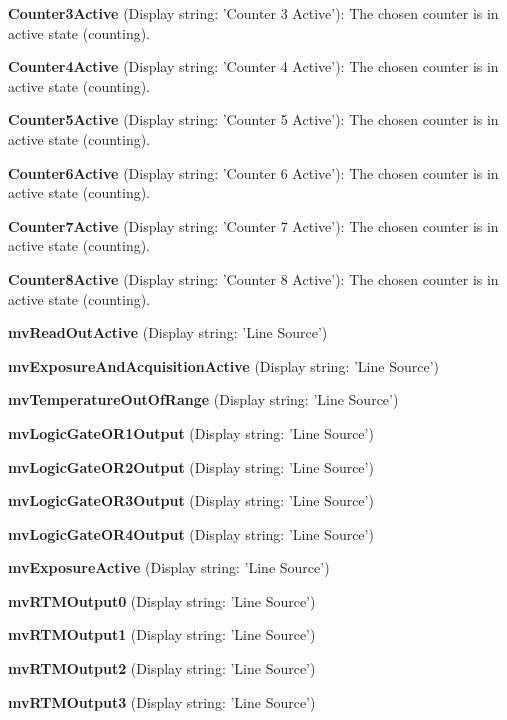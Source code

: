 \begin{DoxyItemize}
\item {\bfseries Counter3\+Active} (Display string\+: 'Counter 3 Active')\+: The chosen counter is in active state (counting).
\item {\bfseries Counter4\+Active} (Display string\+: 'Counter 4 Active')\+: The chosen counter is in active state (counting).
\item {\bfseries Counter5\+Active} (Display string\+: 'Counter 5 Active')\+: The chosen counter is in active state (counting).
\item {\bfseries Counter6\+Active} (Display string\+: 'Counter 6 Active')\+: The chosen counter is in active state (counting).
\item {\bfseries Counter7\+Active} (Display string\+: 'Counter 7 Active')\+: The chosen counter is in active state (counting).
\item {\bfseries Counter8\+Active} (Display string\+: 'Counter 8 Active')\+: The chosen counter is in active state (counting).
\item {\bfseries mv\+Read\+Out\+Active} (Display string\+: 'Line Source')
\item {\bfseries mv\+Exposure\+And\+Acquisition\+Active} (Display string\+: 'Line Source')
\item {\bfseries mv\+Temperature\+Out\+Of\+Range} (Display string\+: 'Line Source')
\item {\bfseries mv\+Logic\+Gate\+O\+R1\+Output} (Display string\+: 'Line Source')
\item {\bfseries mv\+Logic\+Gate\+O\+R2\+Output} (Display string\+: 'Line Source')
\item {\bfseries mv\+Logic\+Gate\+O\+R3\+Output} (Display string\+: 'Line Source')
\item {\bfseries mv\+Logic\+Gate\+O\+R4\+Output} (Display string\+: 'Line Source')
\item {\bfseries mv\+Exposure\+Active} (Display string\+: 'Line Source')
\item {\bfseries mv\+R\+T\+M\+Output0} (Display string\+: 'Line Source')
\item {\bfseries mv\+R\+T\+M\+Output1} (Display string\+: 'Line Source')
\item {\bfseries mv\+R\+T\+M\+Output2} (Display string\+: 'Line Source')
\item {\bfseries mv\+R\+T\+M\+Output3} (Display string\+: 'Line Source')
\end{DoxyItemize}


